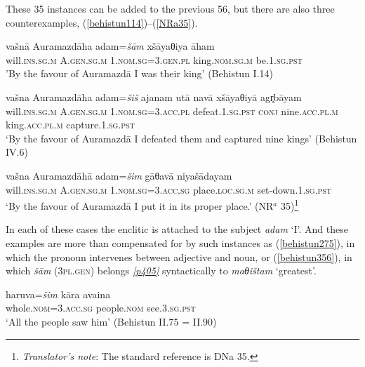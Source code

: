 These 35 instances can be added to the previous 56, but there are also three counterexamples, (\ref{behistun114})--(\ref{NRa35}).

\begin{exe}
\ex
\gll vašnā Auramazdāha adam=\emph{šām} xšāyaθiya āham\\
will.\textsc{ins.sg.m} A.\textsc{gen.sg.m} \textsc{1.nom.sg}=\textsc{3.gen.pl} king.\textsc{nom.sg.m} be.\textsc{1.sg.pst}\\
\trans 'By the favour of Auramazdā I was their king' (Behistun I.14)%
\label{behistun114}
\end{exe}

\begin{exe}
\ex 
\gll vašna Auramazdāha adam=\emph{šiš} ajanam utā navā xšāyaθiyā agr̥bāyam\\
will.\textsc{ins.sg.m} A.\textsc{gen.sg.m} \textsc{1.nom.sg}=\textsc{3.acc.pl} defeat.\textsc{1.sg.pst} \textsc{conj} nine.\textsc{acc.pl.m} king.\textsc{acc.pl.m} capture.\textsc{1.sg.pst}\\
\trans `By the favour of Auramazdā I defeated them and captured nine kings' (Behistun IV.6)
\label{behistun46}
\end{exe}

\begin{exe}
\ex
\gll vašna Auramazdāhā adam=\emph{šim} gāθavā niyašādayam\\
will.\textsc{ins.sg.m} A.\textsc{gen.sg.m} \textsc{1.nom.sg}=\textsc{3.acc.sg} place.\textsc{loc.sg.m} set-down.\textsc{1.sg.pst}\\
\trans `By the favour of Auramazdā I put it in its proper place.' (NR$^a$ 35)\footnote{\emph{Translator's note}: The standard reference is DNa 35.}
\label{NRa35}
\end{exe}

In each of these cases the enclitic is attached to the subject \emph{adam} `I'. And these examples are more than compensated for by such instances as (\ref{behistun275}), in which the pronoun intervenes between adjective and noun, or (\ref{behistun356}), in which \emph{šām} (\textsc{3pl.gen}) belongs \hyperlink{p405}{\emph{[p405]}} syntactically to \emph{maθištam} `greatest'.

\begin{exe}
\ex
\gll haruva=\emph{šim} kāra avaina\\
whole.\textsc{nom}=\textsc{3.acc.sg} people.\textsc{nom} see.\textsc{3.sg.pst}\\
\trans `All the people saw him' (Behistun II.75 = II.90)
\label{behistun275}
\end{exe}

